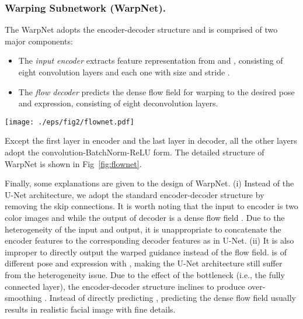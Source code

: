 \documentclass[runningheads]{llncs}
\begin{document}
\subsubsection{Warping Subnetwork (WarpNet).}
The WarpNet adopts the encoder-decoder structure and is comprised of two major components:
\begin{itemize}
\item The \emph{input encoder} extracts feature representation from  and , consisting of eight convolution layers and each one with size  and stride .
\item The \emph{flow decoder} predicts the dense flow field for warping  to the desired pose and expression, consisting of eight deconvolution layers.
\end{itemize}
\begin{figure*}[t]
\setlength{\abovecaptionskip}{-1ex}
\setlength{\belowcaptionskip}{-2ex}
\begin{center}
\texttt{[image: ./eps/fig2/flownet.pdf]}
\end{center}
   \caption{Architecture of our WarpNet. It takes the degraded observation  and guided image  as input to predict the dense flow field , which is adopted to deform  to the warped guidance .  is expected to be spatially well aligned with ground-truth . Landmark loss, TV regularization as well as gradient from RecNet are deployed to facilitate the learning of WarpNet.
    }
   \label{fig:flownet}
\end{figure*}
Except the first layer in encoder and the last layer in decoder, all the other layers adopt the convolution-BatchNorm-ReLU form. The detailed structure of WarpNet is shown in Fig~\ref{fig:flownet}.


Finally, some explanations are given to the design of WarpNet.
(i) Instead of the U-Net architecture, we adopt the standard encoder-decoder structure by removing the skip connections.
It is worth noting that the input to encoder is two color images  and  while the output of decoder is a dense flow field .
Due to the heterogeneity of the input and output, it is unappropriate to concatenate the encoder features to the corresponding decoder features as in U-Net.
(ii) It is also improper to directly output the warped guidance instead of the flow field.
 is of different pose and expression with , making the U-Net architecture still suffer from the heterogeneity issue.
Due to the effect of the bottleneck (i.e., the fully connected layer), the encoder-decoder structure inclines to produce over-smoothing .
Instead of directly predicting , predicting the dense flow field  usually results in realistic facial image with fine details.
\end{document}

